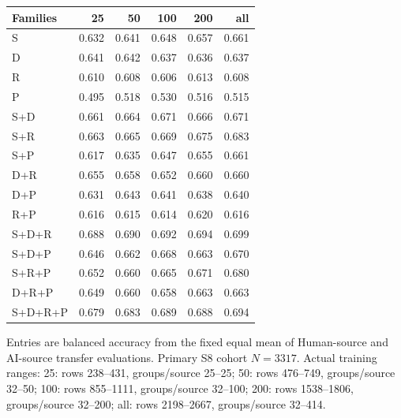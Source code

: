 \begin{tabular}{lrrrrr}
\toprule
Families & 25 & 50 & 100 & 200 & all \\
\midrule
S & 0.632 & 0.641 & 0.648 & 0.657 & 0.661 \\
D & 0.641 & 0.642 & 0.637 & 0.636 & 0.637 \\
R & 0.610 & 0.608 & 0.606 & 0.613 & 0.608 \\
P & 0.495 & 0.518 & 0.530 & 0.516 & 0.515 \\
S+D & 0.661 & 0.664 & 0.671 & 0.666 & 0.671 \\
S+R & 0.663 & 0.665 & 0.669 & 0.675 & 0.683 \\
S+P & 0.617 & 0.635 & 0.647 & 0.655 & 0.661 \\
D+R & 0.655 & 0.658 & 0.652 & 0.660 & 0.660 \\
D+P & 0.631 & 0.643 & 0.641 & 0.638 & 0.640 \\
R+P & 0.616 & 0.615 & 0.614 & 0.620 & 0.616 \\
S+D+R & 0.688 & 0.690 & 0.692 & 0.694 & 0.699 \\
S+D+P & 0.646 & 0.662 & 0.668 & 0.663 & 0.670 \\
S+R+P & 0.652 & 0.660 & 0.665 & 0.671 & 0.680 \\
D+R+P & 0.649 & 0.660 & 0.658 & 0.663 & 0.663 \\
S+D+R+P & 0.679 & 0.683 & 0.689 & 0.688 & 0.694 \\
\bottomrule
\end{tabular}
\par\smallskip
{\footnotesize Entries are balanced accuracy from the fixed equal mean of Human-source and AI-source transfer evaluations. Primary S8 cohort $N=3317$. Actual training ranges: 25: rows 238--431, groups/source 25--25; 50: rows 476--749, groups/source 32--50; 100: rows 855--1111, groups/source 32--100; 200: rows 1538--1806, groups/source 32--200; all: rows 2198--2667, groups/source 32--414.}
